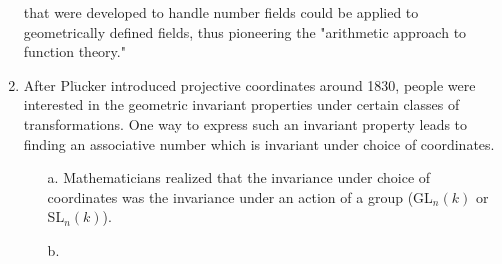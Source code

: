 \begin{enumerate}
            that were developed to handle number fields could be applied to geometrically defined fields, thus
            pioneering the "arithmetic approach to function theory."
      \item
            After Pl$\ddot{\text{u}}$cker introduced projective coordinates around 1830, people were
            interested in the geometric invariant properties under certain classes of transformations. One way to
            express such an invariant property leads to finding an associative number which is invariant under
            choice of coordinates.
            \begin{enumerate}
                  \item[a.]
                        Mathematicians realized that the invariance under choice of coordinates was the invariance
                        under an action of a group (GL$_n(k)$ or SL$_n(k)$).
                  \item[b.]

            \end{enumerate}
\end{enumerate}